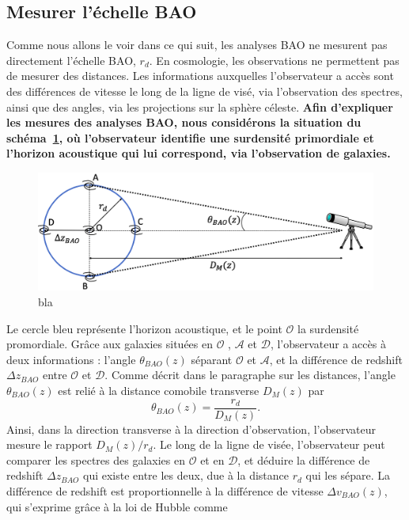 \documentclass[11pt, twoside, a4paper, openright]{report}
\begin{document}
\subsection{Mesurer l'échelle BAO}

Comme nous allons le voir dans ce qui suit, les analyses BAO ne mesurent pas directement l'échelle BAO, $r_{d}$. En cosmologie, les observations  ne permettent pas de mesurer des distances. Les informations auxquelles l'observateur a accès sont des différences de vitesse le long de la ligne de visé, via l'observation des spectres, ainsi que des angles, via les projections sur la sphère céleste.
\textbf{Afin d'expliquer les mesures des analyses BAO, nous considérons la situation du schéma~\ref{fig:bao_dessin}, où l'observateur identifie une surdensité primordiale et l'horizon acoustique qui lui correspond, via l'observation de galaxies.}
\begin{figure}
  \centering
  \label{fig:bao_dessin}
  \includegraphics[scale=0.40]{bao_dessin}
  \caption{bla}
\end{figure}
Le cercle bleu représente l'horizon acoustique, et le point $\mathcal{O}$ la surdensité promordiale. Grâce aux galaxies situées en $\mathcal{O}$ , $\mathcal{A}$  et $\mathcal{D}$, l'observateur a accès à deux informations : l'angle $\theta_{BAO}(z)$ séparant $\mathcal{O}$ et $\mathcal{A}$, et la différence de redshift $\Delta z_{BAO}$ entre $\mathcal{O}$ et $\mathcal{D}$. Comme décrit dans le paragraphe sur les distances, l'angle $\theta_{BAO}(z)$ est relié à la distance comobile transverse $D_M(z)$ par
\begin{equation}
  \label{eq:theta_bao}
  \theta_{BAO}(z) = \frac{r_d}{D_M(z)}.
\end{equation}
Ainsi, dans la direction transverse à la direction d'observation, l'observateur mesure le rapport $D_M(z) / r_d$. Le long de la ligne de visée, l'observateur peut comparer les spectres des galaxies en $\mathcal{O}$ et en $\mathcal{D}$, et déduire la différence de redshift $\Delta z_{BAO}$ qui existe entre les deux, due à la distance $r_d$ qui les sépare. La différence de redshift est proportionnelle à la différence de vitesse $\Delta v_{BAO}(z)$, qui s'exprime grâce à la loi de Hubble comme
\end{document}
